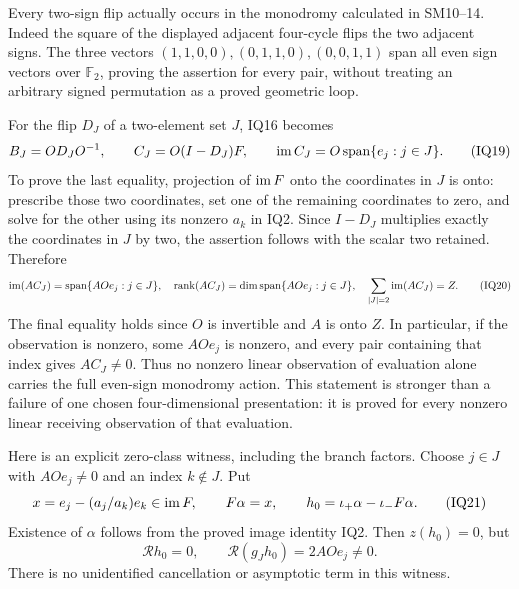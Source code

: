 Every two-sign flip actually occurs in the monodromy calculated in
SM10--14.  Indeed the square of the displayed adjacent four-cycle flips
the two adjacent signs.  The three vectors $(1,1,0,0),(0,1,1,0),(0,0,1,1)$
span all even sign vectors over $\mathbb F_2$, proving the assertion for
every pair, without treating an arbitrary signed permutation as a proved
geometric loop.

For the flip $D_J$ of a two-element set $J$, IQ16 becomes
\[
 B_J=OD_JO^{-1},\qquad
 C_J=O(I-D_J)F,
 \qquad \operatorname{im} C_J=O\operatorname{span}\{e_j:j\in J\}.              \tag{IQ19}
\]
To prove the last equality, projection of $\operatorname{im} F$ onto the coordinates in
$J$ is onto: prescribe those two coordinates, set one of the remaining
coordinates to zero, and solve for the other using its nonzero $a_k$ in
IQ2.  Since $I-D_J$ multiplies exactly the coordinates in $J$ by two,
the assertion follows with the scalar two retained.  Therefore
\[
 \operatorname{im}(AC_J)=\operatorname{span}\{AOe_j:j\in J\},\quad
 \operatorname{rank}(AC_J)=\dim\operatorname{span}\{AOe_j:j\in J\},\quad
 \sum_{|J|=2}\operatorname{im}(AC_J)=Z.                            \tag{IQ20}
\]
The final equality holds since $O$ is invertible and $A$ is onto $Z$.
In particular, if the observation is nonzero, some $AOe_j$ is nonzero,
and every pair containing that index gives $AC_J\ne0$.  Thus no nonzero
linear observation of evaluation alone carries the full even-sign
monodromy action.  This statement is stronger than a failure of one
chosen four-dimensional presentation: it is proved for every nonzero
linear receiving observation of that evaluation.

Here is an explicit zero-class witness, including the branch factors.
Choose $j\in J$ with $AOe_j\ne0$ and an index $k\notin J$.  Put
\[
 x=e_j-(a_j/a_k)e_k\in\operatorname{im} F,\qquad
 F\alpha=x,\qquad
 h_0=\iota_+\alpha-\iota_-F\alpha.                 \tag{IQ21}
\]
Existence of $\alpha$ follows from the proved image identity IQ2.
Then $z(h_0)=0$, but
\[
 \mathcal Rh_0=0,\qquad
 \mathcal R(g_Jh_0)=2AOe_j\ne0.                    \tag{IQ22}
\]
There is no unidentified cancellation or asymptotic term in this witness.

